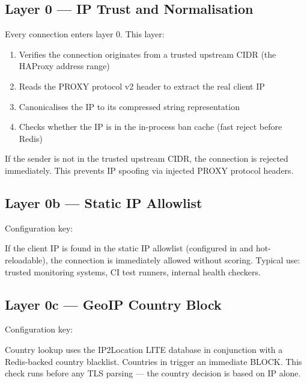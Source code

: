 \subsection{Layer 0 — IP Trust and Normalisation}

Every connection enters layer 0. This layer:
\begin{enumerate}
  \item Verifies the connection originates from a trusted upstream CIDR (the HAProxy address range)
  \item Reads the PROXY protocol v2 header to extract the real client IP
  \item Canonicalises the IP to its compressed string representation
  \item Checks whether the IP is in the in-process ban cache (fast reject before Redis)
\end{enumerate}

If the sender is not in the trusted upstream CIDR, the connection is rejected immediately.
This prevents IP spoofing via injected PROXY protocol headers.

\subsection{Layer 0b — Static IP Allowlist}

Configuration key: 

If the client IP is found in the static IP allowlist (configured in
 and hot-reloadable), the connection is immediately allowed
without scoring. Typical use: trusted monitoring systems, CI test runners, internal
health checkers.

\subsection{Layer 0c — GeoIP Country Block}

Configuration key: 

Country lookup uses the IP2Location LITE database in conjunction with a Redis-backed
country blacklist. Countries in  trigger an immediate
BLOCK. This check runs before any TLS parsing — the country decision is based on IP alone.

